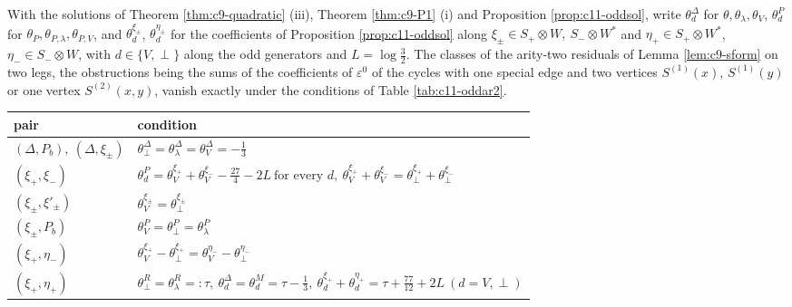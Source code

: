 \begin{theorem}
\label{thm:c11-oddar2}
With the solutions of Theorem \ref{thm:c9-quadratic} (iii), Theorem \ref{thm:c9-P1} (i) and Proposition \ref{prop:c11-oddsol}, write $\theta^\Delta_d$ for $\theta,\theta_\lambda,\theta_V$, $\theta^P_d$ for $\theta_P,\theta_{P,\lambda},\theta_{P,V}$, and $\theta^{\xi_\pm}_d$, $\theta^{\eta_\pm}_d$ for the coefficients of Proposition \ref{prop:c11-oddsol} along $\xi_\pm\in S_+\otimes W,\ S_-\otimes W^*$ and $\eta_+\in S_+\otimes W^*$, $\eta_-\in S_-\otimes W$, with $d\in\{V,\perp\}$ along the odd generators and $L=\log\tfrac32$. The classes of the arity-two residuals of Lemma \ref{lem:c9-sform} on two legs, the obstructions being the sums of the coefficients of $\varepsilon^0$ of the cycles with one special edge and two vertices $S^{(1)}(x)$, $S^{(1)}(y)$ or one vertex $S^{(2)}(x,y)$, vanish exactly under the conditions of Table \ref{tab:c11-oddar2}.

\begin{tabular}{l|l}
pair & condition \\
\hline
$(\Delta,P_b),\ (\Delta,\xi_\pm)$ & $\theta^\Delta_\perp=\theta^\Delta_\lambda=\theta^\Delta_V=-\tfrac13$ \\
$(\xi_+,\xi_-)$ & $\theta^P_d=\theta^{\xi_+}_V+\theta^{\xi_-}_V-\tfrac{27}4-2L\ \text{for every }d,\ \theta^{\xi_+}_V+\theta^{\xi_-}_V=\theta^{\xi_+}_\perp+\theta^{\xi_-}_\perp$ \\
$(\xi_\pm,\xi'_\pm)$ & $\theta^{\xi_\pm}_V=\theta^{\xi_\pm}_\perp$ \\
$(\xi_\pm,P_b)$ & $\theta^P_V=\theta^P_\perp=\theta^P_\lambda$ \\
$(\xi_+,\eta_-)$ & $\theta^{\xi_+}_V-\theta^{\xi_+}_\perp=\theta^{\eta_-}_V-\theta^{\eta_-}_\perp$ \\
$(\xi_+,\eta_+)$ & $\theta^R_\perp=\theta^R_\lambda=:\tau,\ \theta^\Delta_d=\theta^M_d=\tau-\tfrac13,\ \theta^{\xi_+}_d+\theta^{\eta_+}_d=\tau+\tfrac{77}{12}+2L\ (d=V,\perp)$ \\
\end{tabular}


\end{theorem}
